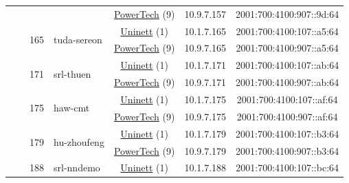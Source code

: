 \begin{small}
\begin{center}
\begin{longtable}{|c|c|c|c|c|c|c|c|}
  &  &  &  & \multicolumn{2}{|c|}{\tiny{\href{http://www.powertech.no}{PowerTech} (9)}} & \tiny{10.9.7.157} & \tiny{2001:700:4100:907::9d:64} \\* \cline{3-3}\cline{4-4}\cline{5-5}\cline{6-6}\cline{7-7}\cline{8-8}
  &  & \multirow{2}{*}{\tiny{165}} & \multicolumn{1}{|l|}{\multirow{2}{*}{\tiny{tuda-sereon}}} & \multicolumn{2}{|c|}{\tiny{\href{https://www.uninett.no}{Uninett} (1)}} & \tiny{10.1.7.165} & \tiny{2001:700:4100:107::a5:64} \\* \cline{5-5}\cline{6-6}\cline{7-7}\cline{8-8}
  &  &  &  & \multicolumn{2}{|c|}{\tiny{\href{http://www.powertech.no}{PowerTech} (9)}} & \tiny{10.9.7.165} & \tiny{2001:700:4100:907::a5:64} \\* \cline{3-3}\cline{4-4}\cline{5-5}\cline{6-6}\cline{7-7}\cline{8-8}
  &  & \multirow{2}{*}{\tiny{171}} & \multicolumn{1}{|l|}{\multirow{2}{*}{\tiny{srl-thuen}}} & \multicolumn{2}{|c|}{\tiny{\href{https://www.uninett.no}{Uninett} (1)}} & \tiny{10.1.7.171} & \tiny{2001:700:4100:107::ab:64} \\* \cline{5-5}\cline{6-6}\cline{7-7}\cline{8-8}
  &  &  &  & \multicolumn{2}{|c|}{\tiny{\href{http://www.powertech.no}{PowerTech} (9)}} & \tiny{10.9.7.171} & \tiny{2001:700:4100:907::ab:64} \\* \cline{3-3}\cline{4-4}\cline{5-5}\cline{6-6}\cline{7-7}\cline{8-8}
  &  & \multirow{2}{*}{\tiny{175}} & \multicolumn{1}{|l|}{\multirow{2}{*}{\tiny{haw-cmt}}} & \multicolumn{2}{|c|}{\tiny{\href{https://www.uninett.no}{Uninett} (1)}} & \tiny{10.1.7.175} & \tiny{2001:700:4100:107::af:64} \\* \cline{5-5}\cline{6-6}\cline{7-7}\cline{8-8}
  &  &  &  & \multicolumn{2}{|c|}{\tiny{\href{http://www.powertech.no}{PowerTech} (9)}} & \tiny{10.9.7.175} & \tiny{2001:700:4100:907::af:64} \\* \cline{3-3}\cline{4-4}\cline{5-5}\cline{6-6}\cline{7-7}\cline{8-8}
  &  & \multirow{2}{*}{\tiny{179}} & \multicolumn{1}{|l|}{\multirow{2}{*}{\tiny{hu-zhoufeng}}} & \multicolumn{2}{|c|}{\tiny{\href{https://www.uninett.no}{Uninett} (1)}} & \tiny{10.1.7.179} & \tiny{2001:700:4100:107::b3:64} \\* \cline{5-5}\cline{6-6}\cline{7-7}\cline{8-8}
  &  &  &  & \multicolumn{2}{|c|}{\tiny{\href{http://www.powertech.no}{PowerTech} (9)}} & \tiny{10.9.7.179} & \tiny{2001:700:4100:907::b3:64} \\* \cline{3-3}\cline{4-4}\cline{5-5}\cline{6-6}\cline{7-7}\cline{8-8}
  &  & \multirow{2}{*}{\tiny{188}} & \multicolumn{1}{|l|}{\multirow{2}{*}{\tiny{srl-nndemo}}} & \multicolumn{2}{|c|}{\tiny{\href{https://www.uninett.no}{Uninett} (1)}} & \tiny{10.1.7.188} & \tiny{2001:700:4100:107::bc:64} \\* \cline{5-5}\cline{6-6}\cline{7-7}\cline{8-8}

\end{longtable}
\end{center}
\end{small}
